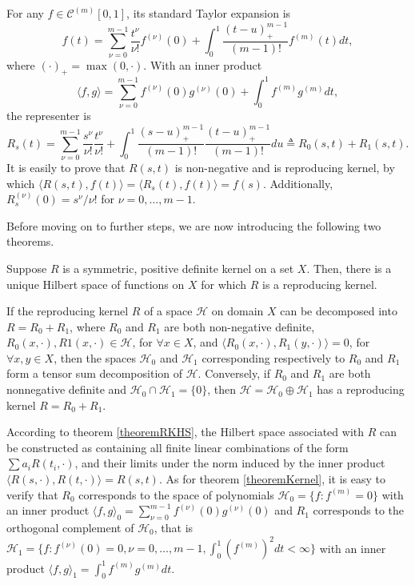For any $f\in \mathcal{C}^{(m)}[0,1]$, its standard Taylor expansion is  
\begin{equation}
f(t) = \sum_{\nu=0}^{m-1}\frac{t^\nu}{\nu!}f^{(\nu)}(0) + \int_{0}^{1}\frac{(t-u)_+^{m-1}}{(m-1)!}f^{(m)}(t)dt,
\end{equation}
where $(\cdot)_+ =\max(0, \cdot)$. With an inner product 
\begin{equation}
\langle f,g \rangle = \sum_{\nu=0}^{m-1}f^{(\nu)}(0)g^{(\nu)}(0) +  \int_{0}^{1}f^{(m)} g^{(m)}dt,
\end{equation}
the representer is 
\begin{equation}\label{GaussianProcessKernelR}
R_s(t) =\sum_{\nu=0}^{m-1} \frac{s^{\nu}}{\nu!} \frac{t^{\nu}}{\nu!} +\int_0^1\frac{ (s-u)_+^{m-1}}{(m-1)!} \frac{ (t-u)_+^{m-1}}{(m-1)!} du \triangleq R_0(s,t)+R_1(s,t). 
\end{equation}
It is easily to prove that $R(s,t)$ is non-negative and is reproducing kernel, by which $\langle R(s,t),f(t) \rangle = \langle R_s(t),f(t) \rangle=f(s)$. Additionally, $R_s^{(\nu)}(0) = s^\nu/\nu!$ for $\nu = 0,\ldots, m-1$.

Before moving on to further steps, we are now introducing the following two theorems. 
\begin{theorem}\cite{aronszajn1950theory}\label{theoremRKHS}
Suppose $R$ is a symmetric, positive definite kernel on a set $X$. Then, there is a unique Hilbert space of functions on $X$ for which $R$ is a reproducing kernel. 
\end{theorem}
\begin{theorem}\cite{gu2013smoothing}\label{theoremKernel}
If the reproducing kernel $R$ of a space $\mathcal{H}$ on domain $X$ can
be decomposed into $R = R_0 + R_1$, where $R_0$ and $R_1$ are both non-negative definite, $R_0(x, \cdot),R1(x,\cdot) \in \mathcal{H}$, for $ \forall x \in X$, and $\langle R_0(x, \cdot),R_1(y, \cdot) \rangle= 0$, for $\forall x, y \in X$, then the spaces $\mathcal{H}_0$ and $\mathcal{H}_1$ corresponding respectively to $R_0$ and $R_1$ form a tensor sum decomposition of $\mathcal{H}$. Conversely, if $R_0$ and $R_1$ are both  nonnegative definite and $\mathcal{H}_0 \cap \mathcal{H}_1 =\{0\}$, then $\mathcal{H} =\mathcal{H}_0 \oplus \mathcal{H}_1$ has a reproducing kernel $R = R_0 + R_1$.
\end{theorem}

According to theorem \ref{theoremRKHS}, the Hilbert space associated with $R$ can be constructed as containing all finite linear combinations of the form $\sum a_iR(t_i,\cdot)$, and their limits under the norm induced by the inner product $\langle R(s,\cdot),R(t,\cdot) \rangle = R(s,t)$. As for theorem \ref{theoremKernel}, it is easy to verify that $R_0$ corresponds to the space of polynomials $\mathcal{H}_0 =\{f:f^{(m)}=0\}$ with an inner product $\langle f, g \rangle_0 = \sum_{\nu=0}^{m-1} f^{(\nu)}(0)g^{(\nu)}(0)$ and $R_1$ corresponds to the orthogonal complement of $\mathcal{H}_0$, that is $\mathcal{H}_1 =\{  f:f^{(\nu)}(0)=0,\nu = 0, \ldots,m-1, \int_{0}^{1}(f^{(m)})^2dt <\infty  \}$ with an inner product $\langle f, g\rangle_1 = \int_{0}^{1}f^{(m)}g^{(m)}dt $. 






